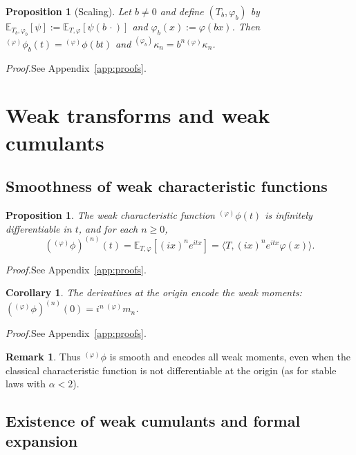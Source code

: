 \documentclass[12pt]{article}
\newtheorem{proposition}[theorem]{Proposition}
\newtheorem{corollary}[theorem]{Corollary}
\theoremstyle{definition}
\newtheorem{remark}[theorem]{Remark}
\newcommand{\E}{\mathbb{E}}
\begin{document}
\begin{proposition}[Scaling]\label{prop:scaling}
Let $b \neq 0$ and define $(T_b,\varphi_b)$ by $\E_{T_b,\varphi_b}[\psi] := \E_{T,\varphi}[\psi(b\,\cdot)]$ and $\varphi_b(x):=\varphi(bx)$.  Then ${}^{(\varphi)}\phi_b(t)={}^{(\varphi)}\phi(bt)$ and ${}^{(\varphi_b)}\kappa_n = b^n{}^{(\varphi)}\kappa_n$.
\end{proposition}

\noindent\textit{Proof.}\enspace See Appendix~\ref{app:proofs}.\medskip


\section{Weak transforms and weak cumulants}
\label{sec:cumulants}

\subsection{Smoothness of weak characteristic functions}
\label{subsec:cumulants_cf}

\begin{proposition}\label{prop:wcf-smooth}
The weak characteristic function ${}^{(\varphi)}\phi(t)$ is infinitely differentiable in $t$, and for each $n \geq 0$,
\[
({}^{(\varphi)}\phi)^{(n)}(t)
=
\E_{T,\varphi}[(ix)^n e^{itx}]
=
\langle T, (ix)^n e^{itx}\varphi(x) \rangle.
\]
\end{proposition}

\noindent\textit{Proof.}\enspace See Appendix~\ref{app:proofs}.\medskip

\begin{corollary}\label{cor:moments-from-cf}
The derivatives at the origin encode the weak moments:
$({}^{(\varphi)}\phi)^{(n)}(0) = i^n\, {}^{(\varphi)}m_n$.
\end{corollary}

\noindent\textit{Proof.}\enspace See Appendix~\ref{app:proofs}.\medskip

\begin{remark}
Thus ${}^{(\varphi)}\phi$ is smooth and encodes all weak moments, even when the classical characteristic function is not differentiable at the origin (as for stable laws with $\alpha<2$).
\end{remark}

\subsection{Existence of weak cumulants and formal expansion}
\label{subsec:cumulants_cgf}
\end{document}
